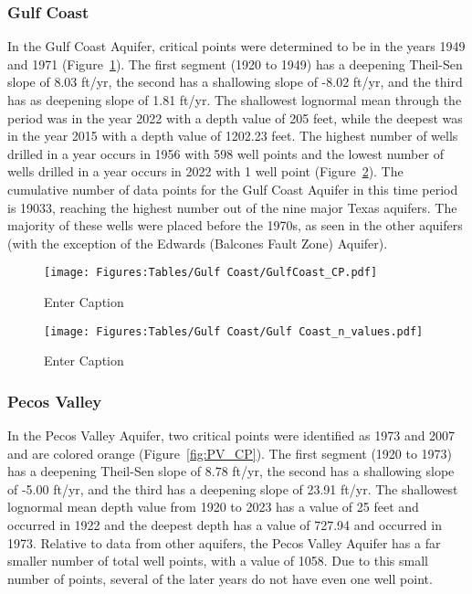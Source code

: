 \subsubsection*{Gulf Coast}
In the Gulf Coast Aquifer, critical points were determined to be in the years 1949 and 1971 (Figure~\ref{fig:GC_CP}). The first segment (1920 to 1949) has a deepening Theil-Sen slope of 8.03 ft/yr, the second has a shallowing slope of -8.02 ft/yr, and the third has as deepening slope of 1.81 ft/yr. The shallowest lognormal mean through the period was in the year 2022 with a depth value of 205 feet, while the deepest was in the year 2015 with a depth value of 1202.23 feet. The highest number of wells drilled in a year occurs in 1956 with 598 well points and the lowest number of wells drilled in a year occurs in 2022 with 1 well point (Figure~\ref{fig:GC_n_value}). The cumulative number of data points for the Gulf Coast Aquifer in this time period is 19033, reaching the highest number out of the nine major Texas aquifers. The majority of these wells were placed before the 1970s, as seen in the other aquifers (with the exception of the Edwards (Balcones Fault Zone) Aquifer).


\begin{figure}[H]
    \centering
    \texttt{[image: Figures:Tables/Gulf Coast/GulfCoast\_CP.pdf]}
    \caption{Enter Caption}
    \label{fig:GC_CP}
\end{figure}

\begin{figure}[H]
    \centering
    \texttt{[image: Figures:Tables/Gulf Coast/Gulf Coast\_n\_values.pdf]}
    \caption{Enter Caption}
    \label{fig:GC_n_value}
\end{figure}

\subsubsection*{Pecos Valley}
In the Pecos Valley Aquifer, two critical points were identified as 1973 and 2007 and are colored orange (Figure~\ref{fig:PV_CP}). The first segment (1920 to 1973) has a deepening Theil-Sen slope of 8.78 ft/yr, the second has a shallowing slope of -5.00 ft/yr, and the third has a deepening slope of 23.91 ft/yr. The shallowest lognormal mean depth value from 1920 to 2023 has a value of 25 feet and occurred in 1922 and the deepest depth has a value of 727.94 and occurred in 1973. Relative to data from other aquifers, the Pecos Valley Aquifer has a far smaller number of total well points, with a value of 1058. Due to this small number of points, several of the later years do not have even one well point.

